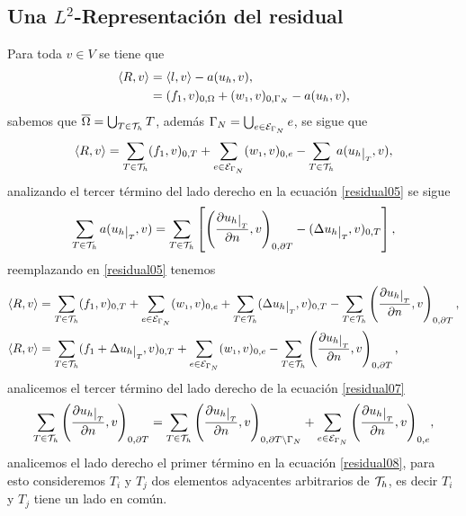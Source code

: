 \subsection{Una \texorpdfstring{$L^{2}$}{L2}-Representaci\'on del residual}
Para toda $v\in V$ se tiene que 
\begin{equation*}
\begin{split}
\langle R,v \rangle &= \langle l,v \rangle - a(u_{h},v),\\
&=(f_{1},v)_{0,\Omega} + (w_{\text{\tiny 1}},v)_{0,\Gamma_{N}} - a(u_{h},v),
\end{split}
\end{equation*}
sabemos que $\overline{\Omega}=\bigcup_{T\in{\ensuremath{\mathcal{T}}}_{h}}T$, adem\'as $\Gamma_{N}=\bigcup_{e\in{\ensuremath{\mathcal{E}}}_{ \Gamma_{N}}}e$, se sigue que 
\begin{equation}\label{residual05}
\langle R,v \rangle = \sum_{T\in\mct_{h}}(f_{1},v)_{0,T} + \sum_{e\in \mce_{ \Gamma_{N}}}(w_{\text{\tiny 1}},v)_{0,e} - \sum_{T\in\mct_{h}} a(u_{h}\restr{\text{\tiny $T$}},v),
\end{equation}
analizando el tercer t\'ermino del lado derecho en la ecuaci\'on \eqref{residual05} se sigue 
\begin{equation*}\label{residual06}
\sum_{T\in\mct_{h}} a(u_{h}\restr{\text{\tiny $T$}},v) = \sum_{T\in\mct_{h}} \left[ \left( \frac{\partial u_{h}\restr{\text{\tiny $T$}}}{\partial n} , v \right)_{0,\partial T} - (\Delta u_{h}\restr{\text{\tiny $T$}},v)_{0,T} \right],
\end{equation*}
reemplazando  en \eqref{residual05} tenemos 
\begin{align}\label{residual07}
\langle R,v \rangle &= \sum_{T\in\mct_{h}} (f_{1},v)_{0,T} + \sum_{e\in\mce_{ \Gamma_{N}}}(w_{\text{\tiny 1}},v)_{0,e} + \sum_{T\in\mct_{h}} (\Delta u_{h}\restr{\text{\tiny $T$}},v)_{0,T} - \sum_{T\in\mct_{h}} \left( \frac{\partial u_{h}\restr{\text{\tiny $T$}}}{\partial n},v \right)_{0,\partial T},\nonumber\\
\langle R,v \rangle &= \sum_{T\in\mct_{h}} (f_{1}+\Delta u_{h}\restr{\text{{\tiny $T$}}},v)_{0,T} + \sum_{e\in\mce_{ \Gamma_{N}}}(w_{\text{\tiny 1}},v)_{0,e} - \sum_{T\in\mct_{h}} \left( \frac{\partial u_{h}\restr{\text{\tiny $T$}}}{\partial n},v \right)_{0,\partial T}, 
\end{align}
analicemos el tercer t\'ermino del lado derecho de la ecuaci\'on \eqref{residual07} 
\begin{equation}\label{residual08}
\sum_{T\in\mct_{h}} \left( \frac{\partial u_{h}\restr{\text{\tiny $T$}}}{\partial n} ,v \right)_{0,\partial T} = \sum_{T\in\mct_{h}} \left( \frac{\partial u_{h}\restr{ \text{\tiny $T$}}}{\partial n},v \right)_{0,\partial T \setminus \Gamma_{N}} + \sum_{e\in\mce_{ \Gamma_{N}}}\Bigg(\frac{\partial u_{h}\restr{ \text{\tiny $T$}}}{\partial n},v \Bigg)_{0,e},
\end{equation}
analicemos el lado derecho el primer t\'ermino en la ecuaci\'on \eqref{residual08}, para esto consideremos $T_{i}$ y $T_{j}$ dos elementos adyacentes arbitrarios de ${\mathcal{T}}_{h}$, es decir $T_{i}$ y $T_{j}$ tiene un lado en com\'un.

